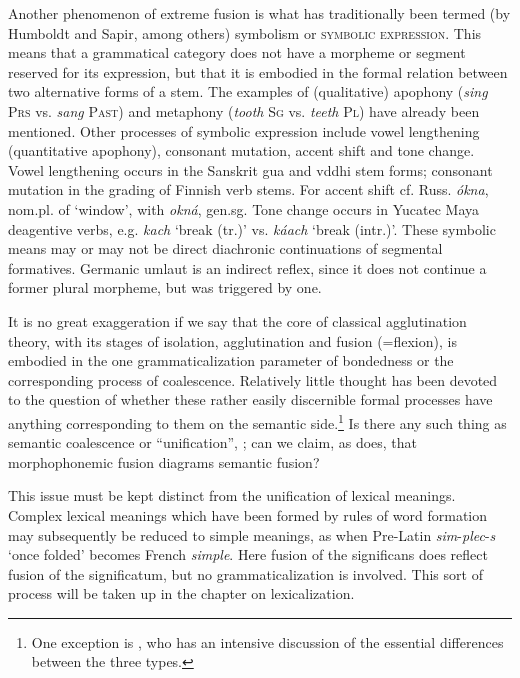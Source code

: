 Another phenomenon of extreme fusion is what has traditionally been termed (by Humboldt and Sapir, among others) symbolism or \textsc{symbolic expression}. This means that a grammatical category does not have a morpheme or segment reserved for its expression, but that it is embodied in the formal relation between two alternative forms of a stem. The examples of (qualitative) apophony (\textit{sing} \textsc{Prs} vs. \textit{sang} \textsc{Past}) and metaphony (\textit{tooth} \textsc{Sg} vs. \textit{teeth} \textsc{Pl}) have already been mentioned. Other processes of symbolic expression include vowel lengthening (quantitative apophony), consonant mutation, accent shift and tone change. Vowel lengthening occurs in the Sanskrit gua and vddhi stem forms; consonant mutation in the grading of Finnish verb stems. For accent shift cf. Russ. \textit{ókna}, nom.pl. of ‘window’, with \textit{okná}, gen.sg. Tone change occurs in Yucatec Maya deagentive verbs, e.g. \textit{kach} ‘break (tr.)’ vs. \textit{káach} ‘break (intr.)’. These symbolic means may or may not be direct diachronic continuations of segmental formatives. Germanic umlaut is an indirect reflex, since it does not continue a former plural morpheme, but was triggered by one.

It is no great exaggeration if we say that the core of classical agglutination theory, with its stages of isolation, agglutination and fusion (=flexion), is embodied in the one grammaticalization parameter of bondedness or the corresponding process of coalescence. Relatively little thought has been devoted to the question of whether these rather easily discernible formal processes have anything corresponding to them on the semantic side.\footnote{One exception is \citet[488--500]{Humboldt1836}, who has an  intensive discussion of the essential differences between the three types.} Is there any such thing as semantic coalescence or “unification”, \citep[§~3]{Žirmunskij1966}; can we claim, as \citet[§~3]{Bybee1981} does, that morphophonemic fusion diagrams semantic fusion?

This issue must be kept distinct from the unification of lexical meanings. Complex lexical meanings which have been formed by rules of word formation may subsequently be reduced to simple meanings, as when Pre-Latin \textit{sim}{}-\textit{plec}{}-\textit{s} ‘once folded’ becomes French \textit{simple}. Here fusion of the significans does reflect fusion of the significatum, but no grammaticalization is involved. This sort of process will be taken up in the chapter on lexicalization.

